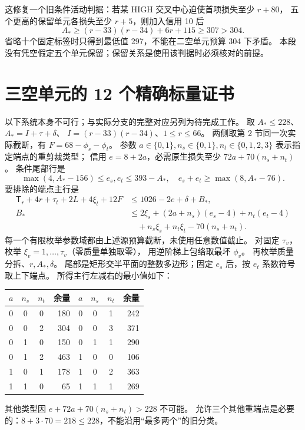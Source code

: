 \documentclass[11pt,a4paper]{article}
\newcommand{\A}{A_*}
\newcommand{\T}{\mathsf T}
\begin{document}
这修复一个旧条件活动判据：若某 HIGH 交叉中心迫使首项损失至少 $r+80$，
五个更高的保留单元各损失至少 $r+5$，则加入信用 10 后
\[
\A\ge (r-33)(r-34)+6r+115\ge307>304.
\]
省略十个固定标签时只得到最低值 297，不能在二空单元预算 304 下矛盾。
本段没有凭空假定五个单元保留；保留关系是使用该判据时必须核对的前提。

\section{三空单元的 12 个精确标量证书}\label{sec:z3}
以下系统本身不可行；与实际分支的完整对应另列为待完成工作。
取 $\A\le228$、$\A=I+\tau+\delta$、
$I=(r-33)(r-34)$、$1\le r\le66$。
两侧取第 2 节同一次实际截断，有 $F=68-\phi_s-\phi_t$。
参数 $a\in\{0,1\},n_s\in\{0,1\},n_t\in\{0,1,2,3\}$ 表示指定端点的重剪裁类型；
信用 $e=8+2a$，必需原生损失至少 $72a+70(n_s+n_t)$。
条件尾部行是
\[
\max(4,\A-156)\le e_s,e_t\le393-\A,
\quad e_s+e_t\ge\max(8,\A-76).
\]
要排除的端点主行是
\begin{align*}
\T_r+4r+\tau_t+2L+4\xi_t+12F
 &\le1026-2e+\delta+B_*,\\
B_*&\le2\xi_s+(2a+n_s)(e_s-4)+n_t(e_t-4)\\
 &\quad+n_s\xi_s+n_t\xi_t-70(n_s+n_t).
\end{align*}
每一个有限枚举参数域都由上述源预算截断，未使用任意数值截止。
对固定 $\tau_v$，枚举 $\xi_v=1,\ldots,\tau_v$（零质量单独取零），
用逆阶梯上包络取最坏 $\phi_v$。
再枚举质量分拆、$r,\A,\delta$。
尾部是矩形交半平面的整数多边形；固定 $e_s$ 后，按 $e_t$ 系数符号取上下端点。
所得主行左减右的最小值如下：
\begin{center}\begin{tabular}{ccc|r@{\qquad}ccc|r}\toprule
$a$&$n_s$&$n_t$&余量&$a$&$n_s$&$n_t$&余量\\\midrule
0&0&0&180&0&0&1&242\\
0&0&2&304&0&0&3&371\\
0&1&0&150&0&1&1&290\\
0&1&2&463&1&0&0&106\\
1&0&1&178&1&0&2&363\\
1&1&0&65&1&1&1&269\\\bottomrule
\end{tabular}\end{center}
其他类型因 $e+72a+70(n_s+n_t)>228$ 不可能。
允许三个其他重端点是必要的：$8+3\cdot70=218\le228$，不能沿用“最多两个”的旧分类。
\end{document}
